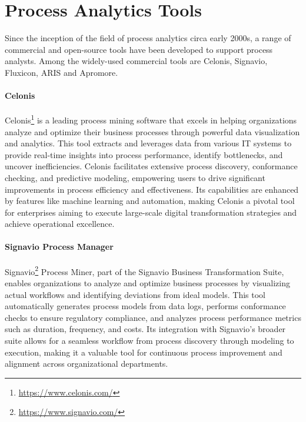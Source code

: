\section{Process Analytics Tools}

Since the inception of the field of process analytics circa early 2000s, a range of commercial and open-source tools have been developed to support process analysts. Among the widely-used commercial tools are Celonis, Signavio, Fluxicon, ARIS and Apromore.

\paragraph*{Celonis}
Celonis\footnote{\url{https://www.celonis.com/}} is a leading process mining software that excels in helping organizations analyze and optimize their business processes through powerful data visualization and analytics. This tool extracts and leverages data from various IT systems to provide real-time insights into process performance, identify bottlenecks, and uncover inefficiencies. Celonis facilitates extensive process discovery, conformance checking, and predictive modeling, empowering users to drive significant improvements in process efficiency and effectiveness. Its capabilities are enhanced by features like machine learning and automation, making Celonis a pivotal tool for enterprises aiming to execute large-scale digital transformation strategies and achieve operational excellence.


\paragraph*{Signavio Process Manager}
Signavio\footnote{\url{https://www.signavio.com/}} Process Miner, part of the Signavio Business Transformation Suite, enables organizations to analyze and optimize business processes by visualizing actual workflows and identifying deviations from ideal models. This tool automatically generates process models from data logs, performs conformance checks to ensure regulatory compliance, and analyzes process performance metrics such as duration, frequency, and costs. Its integration with Signavio's broader suite allows for a seamless workflow from process discovery through modeling to execution, making it a valuable tool for continuous process improvement and alignment across organizational departments.

